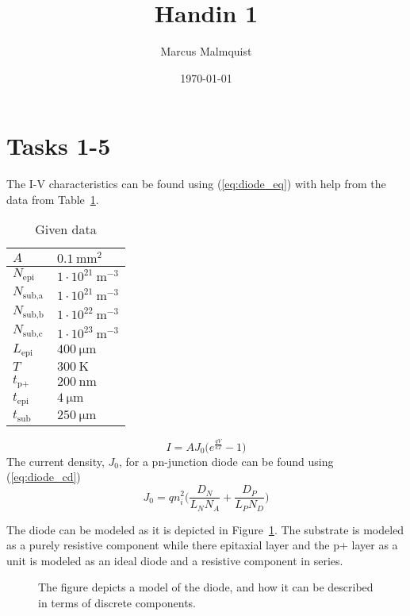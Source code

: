 \documentclass[12pt,a4paper]{article}
\title{Handin 1}
\author{Marcus Malmquist}
\date{\today}
\begin{document}
\maketitle
\section{Tasks 1-5}
The I-V characteristics can be found using (\ref{eq:diode_eq}) with help from the data from Table~\ref{tab:data}.
\begin{table}
  \centering
  \caption{Given data}
  \begin{tabular}{|l|l|} \hline
    $A$ & $\SI{0.1}{\milli\metre^2}$ \\\hline
    $N_{\text{epi}}$ & $1\cdot 10^{21}\SI{}{\metre^{-3}}$ \\\hline
    $N_{\text{sub,a}}$ & $1\cdot 10^{21}\SI{}{\metre^{-3}}$ \\\hline
    $N_{\text{sub,b}}$ & $1\cdot 10^{22}\SI{}{\metre^{-3}}$ \\\hline
    $N_{\text{sub,c}}$ & $1\cdot 10^{23}\SI{}{\metre^{-3}}$ \\\hline
    $L_{\text{epi}}$ & $\SI{400}{\micro\metre}$ \\\hline
    $T$ & $\SI{300}{\kelvin}$ \\\hline
    $t_{\text{p+}}$ & $\SI{200}{\nano\metre}$ \\\hline
    $t_{\text{epi}}$ & $\SI{4}{\micro\metre}$ \\\hline
    $t_{\text{sub}}$ & $\SI{250}{\micro\metre}$ \\\hline
  \end{tabular}
  \label{tab:data}
\end{table}
\begin{equation}
  \label{eq:diode_eq}
  I = AJ_0 \big(e^{\frac{qV}{kT}} - 1\big)
\end{equation}
The current density, $J_0$, for a pn-junction diode can be found using (\ref{eq:diode_cd})
\begin{equation}
  \label{eq:diode_cd}
  J_0 = q n^{2}_{i} \Bigg(\frac{D_N}{L_NN_A} + \frac{D_P}{L_PN_D}\Bigg)
\end{equation}

The diode can be modeled as it is depicted in Figure~\ref{fig:schematic}.
The substrate is modeled as a purely resistive component while there epitaxial layer and the p+ layer as a unit is modeled as an ideal diode and a resistive component in series.
\begin{figure}[!ht]
  \centering
  \noindent\makebox[\textwidth]{\scalebox{0.9}{}}
  \caption{The figure depicts a model of the diode, and how it can be described in terms of discrete components.}
  \label{fig:schematic}
\end{figure}
\end{document}
